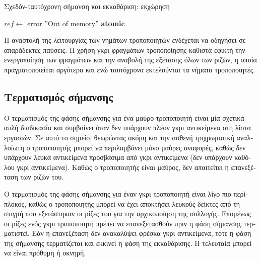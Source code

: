 \begin{greek}
\begin{algorithm}
  \caption{Σχεδόν-ταυτόχρονη σήμανση και εκκαθάριση: εκχώρηση}
  \label{alg:conc_3}
  \begin{algorithmic}[1]
      \State {}
      \State $ref \gets$  
        \State error ''Out of memory''
      \EndIf
      \State {}
    \EndFunction
    \Statex
      \State \textbf{atomic}
          \State {}
        \EndIf
      \EndWhile
    \EndFunction
  \end{algorithmic}
\end{algorithm}

Η αναστολή της λειτουργίας των νημάτων τροποποιητών ενδέχεται να οδηγήσει σε απαράδεκτες
παύσεις. Η χρήση γκρι φραγμάτων τροποποίησης καθιστά εφικτή την ενεργοποίηση των φραγμάτων και την 
αναβολή της εξέτασης όλων των ριζών, η οποία πραγματοποιείται αργότερα και ενώ ταυτόχρονα εκτελούνται 
τα νήματα τροποποιητές. 

\subsection{Τερματισμός σήμανσης}
Ο τερματισμός της φάσης σήμανσης για ένα μαύρο τροποποιητή είναι μία σχετικά απλή διαδικασία και 
συμβαίνει όταν δεν υπάρχουν πλέον γκρι αντικείμενα στη λίστα εργασιών. Σε αυτό το σημείο, θεωρώντας 
ακόμη και την ασθενή τριχρωματική αναλλοίωτη ο τροποποιητής μπορεί να περιλαμβάνει μόνο μαύρες 
αναφορές, καθώς δεν υπάρχουν λευκά αντικείμενα προσβάσιμα από γκρι αντικείμενα (δεν υπάρχουν καθόλου 
γκρι αντικείμενα). Καθώς ο τροποποιητής είναι μαύρος, δεν απαιτείτει η επανεξέταση των ριζών του.

Ο τερματισμός της φάσης σήμανσης για έναν γκρι τροποποιητή είναι λίγο πιο περίπλοκος, καθώς ο 
τροποποιητής μπορεί να έχει αποκτήσει λευκούς δείκτες από τη στιγμή που εξετάστηκαν οι ρίζες του για 
την αρχικοποίηση της συλλογής. Επομένως οι ρίζες ενός γκρι τροποποιητή πρέπει να επανεξετασθούν πριν 
η φάση σήμανσης τερματιστεί. Εάν η επανεξέταση δεν ανακαλύψει φρέσκα γκρι αντικείμενα, τότε η φάση 
της σήμανσης τερματίζεται και εκκινεί η φάση της εκκαθάρισης. Η τελευταία μπορεί να είναι πρόθυμη ή 
οκνηρή. 


\end{greek}
